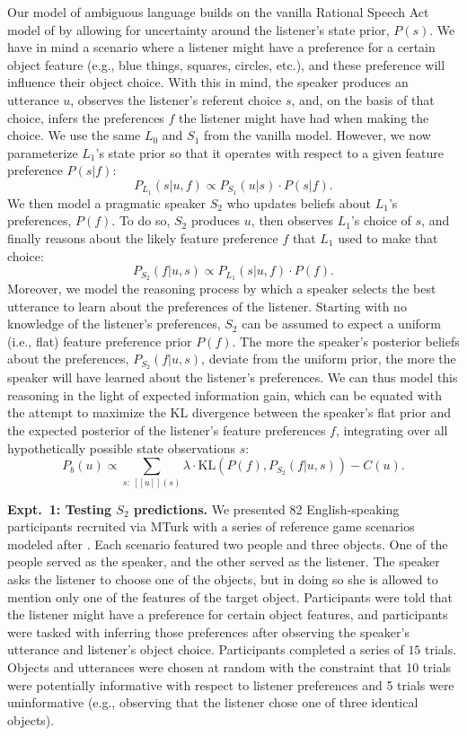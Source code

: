 \documentclass[12pt]{article}
\begin{document}
Our model of ambiguous language builds on the vanilla Rational Speech Act model of \cite{frankgoodman2012} by allowing for uncertainty around the listener's state prior, $P(s)$. We have in mind a scenario where a listener might have a preference for a certain object feature (e.g., blue things, squares, circles, etc.), and these preference will influence their object choice. With this in mind, the speaker produces an utterance $u$, observes the listener's referent choice $s$, and, on the basis of that choice, infers the preferences $f$ the listener might have had when making the choice.
We use the same $L_0$ and $S_1$ from the vanilla model. However, we now parameterize $L_1$'s state prior so that it operates with respect to a given feature preference $P(s|f)$:
$$P_{L_{1}}(s|u,f) \propto P_{S_{1}}(u|s) \cdot P(s|f).$$
We then model a pragmatic speaker $S_2$ who updates beliefs about $L_1$'s preferences, $P(f)$. To do so, $S_2$ produces $u$, then observes $L_1$'s choice of $s$, and finally reasons about the likely feature preference $f$ that $L_1$ used to make that choice:
$$P_{S_{2}}(f|u,s) \propto P_{L_{1}}(s|u,f) \cdot P(f).$$
Moreover, we model the reasoning process by which a speaker selects the best utterance to learn about the preferences of the listener.
Starting with no knowledge of the listener's preferences, $S_2$ can be assumed to expect a uniform (i.e., flat) feature preference prior $P(f)$. The more the speaker's posterior beliefs about the preferences, $P_{S_{2}}(f|u,s)$, deviate from the uniform prior, the more the speaker will have learned about the listener's preferences. 
We can thus model this reasoning in the light of expected information gain, which can be equated with the attempt to maximize the KL divergence between the speaker's flat prior and the expected posterior of the listener's feature preferences $f$, integrating over all hypothetically possible state observations $s$:
$$P_{b}(u) \propto \sum_{s:\  [\![u]\!](s)}\lambda \cdot \textrm{KL}(P(f),P_{S_{2}}(f|u,s))-C(u).$$


\noindent \textbf{Expt.~1: Testing $S_2$ predictions.} We presented 82 English-speaking participants recruited via MTurk with a series of reference game scenarios modeled after \cite{frankgoodman2012}. Each scenario featured two people and three objects. One of the people served as the speaker, and the other served as the listener. The speaker asks the listener to choose one of the objects, but in doing so she is allowed to mention only one of the features of the target object. Participants were told that the listener might have a preference for certain object features, and participants were tasked with inferring those preferences after observing the speaker's utterance and listener's object choice. Participants completed a series of $15$ trials. Objects and utterances were chosen at random with the constraint that 10 trials were potentially informative with respect to listener preferences and 5 trials were uninformative (e.g., observing that the listener chose one of three identical objects).
\end{document}
